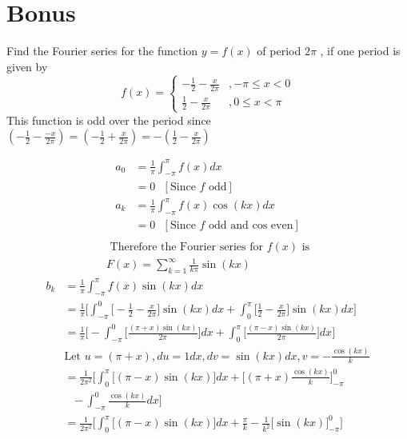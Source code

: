 \documentclass{article}
\begin{document}
\section*{Bonus}
Find the Fourier series for the function $y = f(x)$ of period $2\pi$ , if one period is given by
\[ f(x) =
    \begin{cases}
        -\frac{1}{2}-\frac{x}{2\pi} &, -\pi \leq x < 0 \\
        \frac{1}{2}-\frac{x}{2\pi} &, 0 \leq x < \pi
    \end{cases}
\]
This function is odd over the period since $(-\frac{1}{2}-\frac{-x}{2\pi} ) =(-\frac{1}{2}+\frac{x}{2\pi}) = - (\frac{1}{2} - \frac{x}{2\pi} )$ \\
\begin{multicols}{2}
    \noindent
    \begin{align*}
        a_0 &= \frac{1}{\pi}\int_{-\pi}^{\pi}f(x)dx \\ 
        &= 0 \: \: \: [\text{Since $f$ odd}] \\
        a_k &= \frac{1}{\pi}\int_{-\pi}^{\pi}f(x)\cos(kx)dx \\ 
        &= 0 \: \: \: [\text{Since $f$ odd and cos even}] \\
        \end{align*}
        \begin{align*}
        \text{ Therefore the Fourier series for $f(x)$ is} \\
        F(x) = \sum_{k=1}^{\infty}\frac{1}{k\pi}\sin(kx) 
    \end{align*}
    \begin{align*}
        b_k &= \frac{1}{\pi}\int_{-\pi}^{\pi}f(x)\sin(kx)dx \\ 
        &= \frac{1}{\pi} \Bigg[\int_{-\pi}^{0}\Big[-\frac{1}{2}-\frac{x}{2\pi}\Big]\sin(kx)dx + \int_{0}^{\pi}\Big[\frac{1}{2}-\frac{x}{2\pi}\Big]\sin(kx)dx \Bigg]\\ 
        &= \frac{1}{\pi} \Bigg[-\int_{-\pi}^{0}\Big[\frac{(\pi+x)\sin(kx)}{2\pi}\Big]dx + \int_{0}^{\pi}\Big[\frac{(\pi-x)\sin(kx)}{2\pi}\Big]dx \Bigg]\\ 
        &\text{Let $u = (\pi+x), du = 1 dx, dv = \sin(kx) dx, v = -\frac{\cos(kx)}{k}$} \\
        &= \frac{1}{2\pi^2} \Bigg[ \int_{0}^{\pi}\Big[(\pi-x)\sin(kx)\Big]dx + \Big[(\pi+x)\frac{\cos(kx)}{k}\Big]_{-\pi}^{0}\\ 
        & \: \: \: - \int_{-\pi}^{0}\frac{\cos(kx)}{k}dx \Bigg] \\
        &= \frac{1}{2\pi^2} \Bigg[ \int_{0}^{\pi}\Big[(\pi-x)\sin(kx)\Big]dx + \frac{\pi}{k} - \frac{1}{k^2}\Big[\sin(kx)\Big]_{-\pi}^{0} \Bigg] \\

\end{align*}
\end{multicols}
\end{document}
